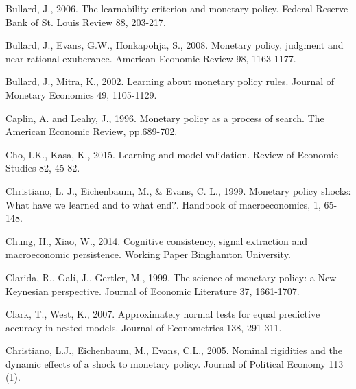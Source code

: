 \begin{thebibliography}{}






 Bullard, J., 2006. The learnability criterion and monetary
policy. Federal Reserve Bank of St. Louis Review 88, 203-217.

%
 Bullard, J., Evans, G.W., Honkapohja, S., 2008.
Monetary policy, judgment and near-rational exuberance. American
Economic Review 98, 1163-1177.

%
 Bullard, J., Mitra, K., 2002.
Learning about monetary policy rules. Journal of Monetary Economics
49, 1105-1129.

\bibitem{} Caplin, A. and Leahy, J., 1996.
 Monetary policy as a process of search. The American Economic Review, pp.689-702.

Cho, I.K., Kasa, K., 2015.
Learning and model validation.
{Review of Economic Studies} 82, 45-82.


\bibitem{} Christiano, L. J., Eichenbaum, M., \& Evans, C. L., 1999.
 Monetary policy shocks: What have we learned and to what end?. Handbook of macroeconomics, 1, 65-148.

\bibitem{} Chung, H., Xiao, W., 2014.
Cognitive consistency, signal extraction and macroeconomic persistence.
Working Paper Binghamton University.

\bibitem{} Clarida, R., Gal\'{i}, J., Gertler, M., 1999.
The science of monetary policy: a New Keynesian perspective. {Journal of Economic Literature} 37, 1661-1707.

 Clark, T., West, K., 2007.
Approximately normal tests for equal predictive accuracy in nested models. Journal of Econometrics
138, 291-311.

\bibitem{}Christiano, L.J., Eichenbaum, M., Evans, C.L., 2005.
Nominal rigidities and the dynamic effects of a shock to monetary policy. Journal of Political Economy 113 (1).


\end{thebibliography}
